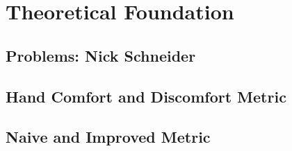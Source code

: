 \chapter{Theoretical Foundation}\label{chapter:theory}

\section{Problems: Nick Schneider}

\section{Hand Comfort and Discomfort Metric}

\section{Naive and Improved Metric}
